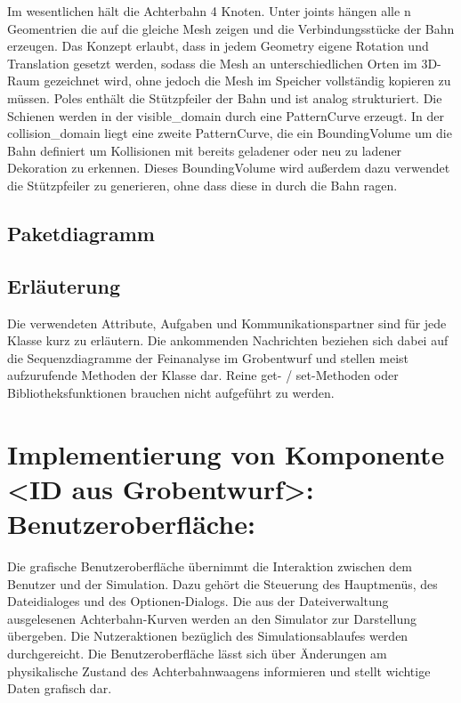 Im wesentlichen hält die Achterbahn 4 Knoten. Unter joints hängen alle n Geomentrien die auf die gleiche Mesh zeigen und die Verbindungsstücke der Bahn erzeugen. Das Konzept erlaubt, dass in jedem Geometry eigene Rotation und 
Translation gesetzt werden, sodass die Mesh an unterschiedlichen Orten im 3D-Raum gezeichnet wird, ohne jedoch die Mesh im Speicher vollständig kopieren zu müssen. Poles enthält die Stützpfeiler der Bahn und ist analog strukturiert.
Die Schienen werden in der visible\_domain durch eine PatternCurve erzeugt. In der collision\_domain liegt eine zweite PatternCurve, die ein BoundingVolume um die Bahn definiert um Kollisionen mit bereits geladener oder neu zu ladener
Dekoration zu erkennen. Dieses BoundingVolume wird außerdem dazu verwendet die Stützpfeiler zu generieren, ohne dass diese in durch die Bahn ragen.



\subsection{Paketdiagramm}
\subsection{Erläuterung}

Die verwendeten Attribute, Aufgaben und Kommunikationspartner sind für jede
Klasse kurz zu erläutern. Die ankommenden Nachrichten beziehen sich dabei auf
die Sequenzdiagramme der Feinanalyse im Grobentwurf und stellen meist
aufzurufende Methoden der Klasse dar.  Reine get- / set-Methoden oder
Bibliotheksfunktionen brauchen nicht aufgeführt zu werden.

\section{Implementierung von Komponente
         <ID aus Grobentwurf>: Benutzeroberfläche:}

Die grafische Benutzeroberfläche übernimmt die Interaktion zwischen dem Benutzer und
der Simulation. Dazu gehört die Steuerung des Hauptmenüs, des Dateidialoges und
des Optionen-Dialogs. Die aus der Dateiverwaltung ausgelesenen Achterbahn-Kurven 
werden an den Simulator zur Darstellung übergeben. Die Nutzeraktionen bezüglich des
Simulationsablaufes werden durchgereicht. Die Benutzeroberfläche lässt sich über
Änderungen am physikalische Zustand des Achterbahnwaagens informieren und stellt
wichtige Daten grafisch dar.

